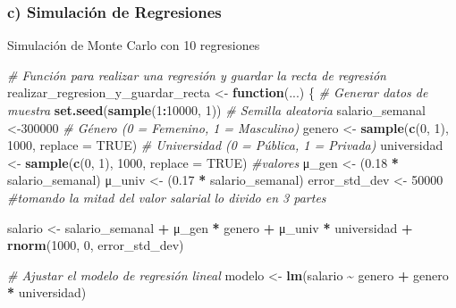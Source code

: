 \documentclass[
]{article}
\newenvironment{Shaded}{\begin{snugshade}}{\end{snugshade}}
\newcommand{\AttributeTok}[1]{\textcolor[rgb]{0.13,0.29,0.53}{#1}}
\newcommand{\CommentTok}[1]{\textcolor[rgb]{0.56,0.35,0.01}{\textit{#1}}}
\newcommand{\ConstantTok}[1]{\textcolor[rgb]{0.56,0.35,0.01}{#1}}
\newcommand{\ControlFlowTok}[1]{\textcolor[rgb]{0.13,0.29,0.53}{\textbf{#1}}}
\newcommand{\DecValTok}[1]{\textcolor[rgb]{0.00,0.00,0.81}{#1}}
\newcommand{\FloatTok}[1]{\textcolor[rgb]{0.00,0.00,0.81}{#1}}
\newcommand{\FunctionTok}[1]{\textcolor[rgb]{0.13,0.29,0.53}{\textbf{#1}}}
\newcommand{\NormalTok}[1]{#1}
\newcommand{\OtherTok}[1]{\textcolor[rgb]{0.56,0.35,0.01}{#1}}
\newcommand{\SpecialCharTok}[1]{\textcolor[rgb]{0.81,0.36,0.00}{\textbf{#1}}}
\begin{document}
\subsubsection{c) Simulación de
Regresiones}\label{c-simulaciuxf3n-de-regresiones}

Simulación de Monte Carlo con 10 regresiones

\begin{Shaded}
\begin{Highlighting}[]
\CommentTok{\# Función para realizar una regresión y guardar la recta de regresión}
\NormalTok{realizar\_regresion\_y\_guardar\_recta }\OtherTok{\textless{}{-}} \ControlFlowTok{function}\NormalTok{(...) \{}
  \CommentTok{\# Generar datos de muestra}
  \FunctionTok{set.seed}\NormalTok{(}\FunctionTok{sample}\NormalTok{(}\DecValTok{1}\SpecialCharTok{:}\DecValTok{10000}\NormalTok{, }\DecValTok{1}\NormalTok{))  }\CommentTok{\# Semilla aleatoria}
\NormalTok{  salario\_semanal }\OtherTok{\textless{}{-}}\DecValTok{300000} 
  \CommentTok{\# Género (0 = Femenino, 1 = Masculino)}
\NormalTok{  genero }\OtherTok{\textless{}{-}} \FunctionTok{sample}\NormalTok{(}\FunctionTok{c}\NormalTok{(}\DecValTok{0}\NormalTok{, }\DecValTok{1}\NormalTok{), }\DecValTok{1000}\NormalTok{, }\AttributeTok{replace =} \ConstantTok{TRUE}\NormalTok{)}
  \CommentTok{\# Universidad (0 = Pública, 1 =  Privada)}
\NormalTok{  universidad }\OtherTok{\textless{}{-}} \FunctionTok{sample}\NormalTok{(}\FunctionTok{c}\NormalTok{(}\DecValTok{0}\NormalTok{, }\DecValTok{1}\NormalTok{), }\DecValTok{1000}\NormalTok{, }\AttributeTok{replace =} \ConstantTok{TRUE}\NormalTok{)}
  \CommentTok{\#valores}
\NormalTok{  μ\_gen }\OtherTok{\textless{}{-}}\NormalTok{ (}\FloatTok{0.18} \SpecialCharTok{*}\NormalTok{ salario\_semanal)}
\NormalTok{  μ\_univ }\OtherTok{\textless{}{-}}\NormalTok{ (}\FloatTok{0.17} \SpecialCharTok{*}\NormalTok{ salario\_semanal)}
\NormalTok{  error\_std\_dev }\OtherTok{\textless{}{-}} \DecValTok{50000} \CommentTok{\#tomando la mitad del valor salarial lo divido en 3 partes}

\NormalTok{  salario }\OtherTok{\textless{}{-}}\NormalTok{ salario\_semanal }\SpecialCharTok{+}\NormalTok{ μ\_gen }\SpecialCharTok{*}\NormalTok{ genero }\SpecialCharTok{+}\NormalTok{ μ\_univ }\SpecialCharTok{*}\NormalTok{ universidad }\SpecialCharTok{+} \FunctionTok{rnorm}\NormalTok{(}\DecValTok{1000}\NormalTok{, }\DecValTok{0}\NormalTok{, error\_std\_dev)}
    
  \CommentTok{\# Ajustar el modelo de regresión lineal}
\NormalTok{  modelo }\OtherTok{\textless{}{-}} \FunctionTok{lm}\NormalTok{(salario }\SpecialCharTok{\textasciitilde{}}\NormalTok{ genero }\SpecialCharTok{+}\NormalTok{ genero }\SpecialCharTok{*}\NormalTok{ universidad)}


\end{Highlighting}
\end{Shaded}
\end{document}
